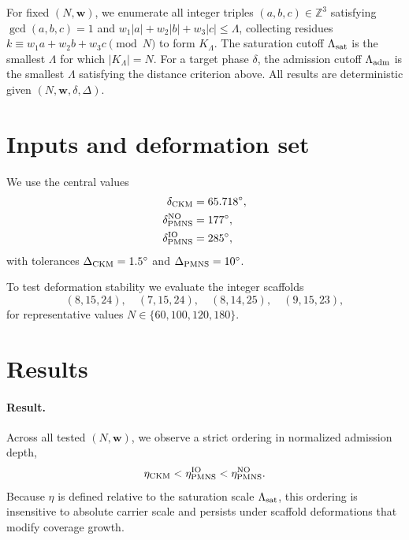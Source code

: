 \documentclass[aps,prd,twocolumn,nofootinbib,superscriptaddress]{revtex4-2}
\begin{document}
For fixed $(N,\mathbf{w})$, we enumerate all integer triples $(a,b,c)\in\mathbb{Z}^3$ satisfying $\gcd(a,b,c)=1$ and
$w_1|a|+w_2|b|+w_3|c|\le \Lambda$, collecting residues
$k\equiv w_1 a+w_2 b+w_3 c\pmod N$ to form $K_\Lambda$.
The saturation cutoff $\Lambda_{\rm sat}$ is the smallest $\Lambda$ for which $|K_\Lambda|=N$.
For a target phase $\delta$, the admission cutoff $\Lambda_{\rm adm}$ is the smallest $\Lambda$ satisfying the distance criterion above.
All results are deterministic given $(N,\mathbf{w},\delta,\Delta)$.

\section{Inputs and deformation set}

We use the central values
\begin{align}
\delta_{\rm CKM} &= 65.718^\circ,\\
\delta_{\rm PMNS}^{\rm NO} &= 177^\circ,\\
\delta_{\rm PMNS}^{\rm IO} &= 285^\circ,
\end{align}
with tolerances $\Delta_{\rm CKM}=1.5^\circ$ and $\Delta_{\rm PMNS}=10^\circ$.

To test deformation stability we evaluate the integer scaffolds
\begin{equation}
(8,15,24),\quad (7,15,24),\quad (8,14,25),\quad (9,15,23),
\end{equation}
for representative values $N\in\{60,100,120,180\}$.

\section{Results}

\paragraph{Result.}
Across all tested $(N,\mathbf{w})$, we observe a strict ordering in normalized admission depth,
\begin{equation}
\eta_{\rm CKM}<\eta_{\rm PMNS}^{\rm IO}<\eta_{\rm PMNS}^{\rm NO}.
\end{equation}
Because $\eta$ is defined relative to the saturation scale $\Lambda_{\rm sat}$, this ordering is insensitive to absolute carrier scale and persists under scaffold deformations that modify coverage growth.
\end{document}
